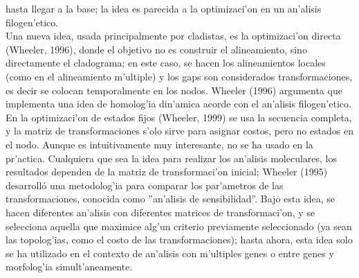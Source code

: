 hasta llegar a la base; la idea es parecida a la optimizaci'on en un an'alisis filogen'etico.\\
Una nueva idea, usada principalmente por cladistas, es la optimizaci'on directa (Wheeler, 1996), donde el 
objetivo no es construir el alineamiento, sino directamente el cladograma; en este caso, se hacen los alineamientos locales 
(como en el alineamiento m'ultiple) y los gaps son considerados transformaciones, es decir se colocan temporalmente en 
los nodos. Wheeler (1996) argumenta que implementa una idea de homolog'ia din'amica acorde con el an'alisis filogen'etico. 
En la optimizaci'on de estados fijos (Wheeler, 1999) se usa la secuencia completa, y la matriz de transformaciones s'olo 
sirve para asignar costos, pero no estados en el nodo.  Aunque es intuitivamente muy 
interesante, no se ha usado en la pr'actica. Cualquiera que sea la idea para realizar los an'alisis moleculares, los 
resultados dependen de la matriz de transformaci'on inicial; Wheeler (1995) desarroll\'o una metodolog'ia para comparar 
los par'ametros de las transformaciones, conocida como ''an'alisis de sensibilidad''.
Bajo esta idea, se hacen diferentes an'alisis con diferentes matrices de transformaci'on, y se selecciona aquella que 
maximice alg'un criterio previamente seleccionado (ya sean las topolog'ias, como el costo de las transformaciones); hasta 
ahora, esta idea solo se ha utilizado en el contexto de an'alisis con m'ultiples genes o entre genes y morfolog'ia 
simult'aneamente.
